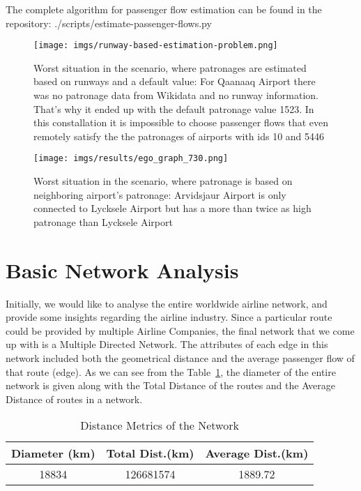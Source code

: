 \documentclass[twocolumn]{tum-article}
\begin{document}
The complete algorithm for passenger flow estimation can be found in the repository: ./scripts/estimate-passenger-flows.py

\begin{figure}[h]
	\centering
	\texttt{[image: imgs/runway-based-estimation-problem.png]}
	\caption{Worst situation in the scenario, where patronages are estimated based on runways and a default value: 
For Qaanaaq Airport there was no patronage data from Wikidata and no runway information. That's why it ended up with the default patronage value 1523. In this constallation it is impossible to choose passenger flows that even remotely satisfy the the patronages of airports with ids 10 and 5446}
	\label{fig:impossible_flows}
\end{figure}

\begin{figure}[h]

	\centering
	\texttt{[image: imgs/results/ego\_graph\_730.png]}
	\caption{Worst situation in the scenario, where patronage is based on neighboring airport's patronage: 
Arvidsjaur Airport is only connected to Lycksele Airport but has a more than twice as high patronage than Lycksele Airport}
	\label{fig:worst_flow_fit}
\end{figure}



\section{Basic Network Analysis}
Initially, we would like to analyse the entire worldwide airline network, and provide some insights regarding the airline industry.
Since a particular route could be provided by multiple Airline Companies, the final network that we come up with is a Multiple Directed Network.
The attributes of each edge in this network included both the geometrical distance and the average passenger flow of that route (edge). 
As we can see from the Table~\ref{Tab:distance_metrics}, the diameter of the entire network is given along with the Total Distance of the routes and the Average Distance of routes in a network.  

\begin{center}
\begin{table}[ht]	
 \begin{tabular}{| c | c | c |}
 \hline
 \textbf{Diameter (km)} & \textbf{Total Dist.(km)} & \textbf{Average Dist.(km)} \\ [0.5ex]
 \hline
 18834 & 126681574 & 1889.72 \\
 \hline
 \end{tabular}
\caption{Distance Metrics of the Network}
\label{Tab:distance_metrics}	 
\end{table}
\end{center}
\end{document}
